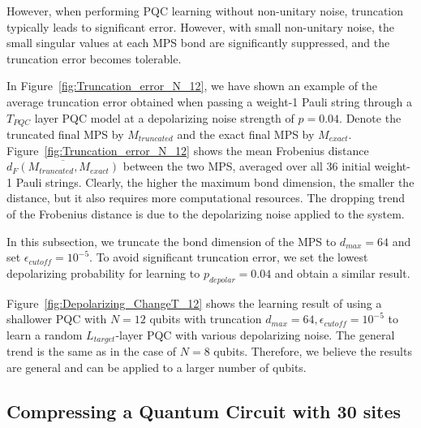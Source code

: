 \documentclass[%
 reprint,
superscriptaddress,
 amsmath,amssymb,
 aps,
]{revtex4-2}
\begin{document}
However, when performing PQC learning without non-unitary noise, truncation typically leads to significant error. However, with small non-unitary noise, the small singular values at each MPS bond are significantly suppressed, and the truncation error becomes tolerable. 

In Figure~\ref{fig:Truncation_error_N_12}, we have shown an example of the average truncation error obtained when passing a weight-1 Pauli string through a $T_{PQC}$ layer PQC model at a depolarizing noise strength of $p=0.04$. Denote the truncated final MPS by $M_{truncated}$ and the exact final MPS by $M_{exact}$. Figure~\ref{fig:Truncation_error_N_12} shows the mean Frobenius distance $\overline{d_F(M_{truncated}, M_{exact})}$ between the two MPS, averaged over all 36 initial weight-1 Pauli strings. Clearly, the higher the maximum bond dimension, the smaller the distance, but it also requires more computational resources. The dropping trend of the Frobenius distance is due to the depolarizing noise applied to the system.

In this subsection, we truncate the bond dimension of the MPS to $d_{max}=64$ and set $\epsilon_{cutoff}=10^{-5}$. To avoid significant truncation error, we set the lowest depolarizing probability for learning to $p_{depolar}=0.04$ and obtain a similar result.

Figure~\ref{fig:Depolarizing_ChangeT_12} shows the learning result of using a shallower PQC with $N=12$ qubits with truncation $d_{max}=64, \epsilon_{cutoff}=10^{-5}$ to learn a random $L_{target}$-layer PQC with various depolarizing noise. The general trend is the same as in the case of $N=8$ qubits. Therefore, we believe the results are general and can be applied to a larger number of qubits.


\subsection{Compressing a Quantum Circuit with 30 sites}
\end{document}
